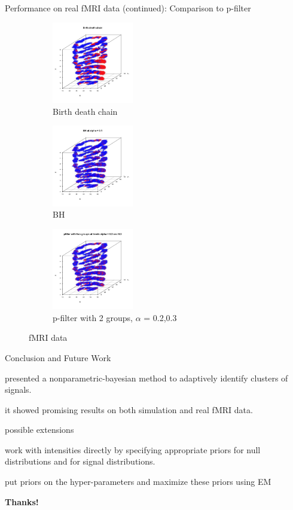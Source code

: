 \documentclass[10pt,mathserif]{beamer}
\begin{document}
\begin{frame}{Performance on real fMRI data (continued): Comparison to p-filter}
\begin{figure}[t!]
    \centering
    \begin{subfigure}[t]{0.3\textwidth}
        \centering
        \includegraphics[height=1.4in]{../BDC_predictions.jpg}
        \caption{Birth death chain}
    \end{subfigure}%
    \begin{subfigure}[t]{0.3\textwidth}
        \centering
        \includegraphics[height=1.4in]{../BH_predictions.jpg}
        \caption{BH}
    \end{subfigure}%
    \begin{subfigure}[t]{0.3\textwidth}
        \centering
        \includegraphics[height=1.4in]{../pfilter_predictions2.jpg}
        \caption{p-filter with 2 groups, $\alpha$ = 0.2,0.3}
    \end{subfigure}
    \caption{fMRI data}
\end{figure}
\end{frame}

\begin{frame}{Conclusion and Future Work}
\BIT
\item presented a nonparametric-bayesian method to adaptively identify clusters of signals.
\item it showed promising results on both simulation and real fMRI data.
\item possible extensions
\BIT 
\item work with intensities directly by specifying appropriate priors for null distributions and for signal distributions.
\item put priors on the hyper-parameters and maximize these priors using EM
\EIT  
\EIT
\begin{center}
\textbf{\large Thanks!}
\end{center}
\end{frame}
\end{document}
